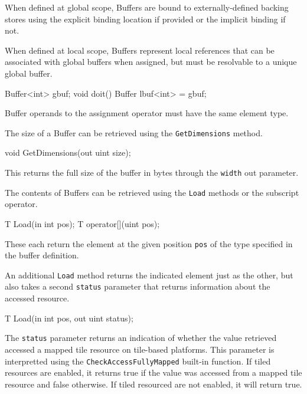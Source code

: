 When defined at global scope, Buffers are bound to externally-defined backing stores
using the explicit binding location if provided or the implicit binding if not.

When defined at local scope, Buffers represent local references
that can be associated with global buffers when assigned,
but must be resolvable to a unique global buffer.

\begin{HLSL}
  Buffer<int> gbuf;
  void doit() {
    Buffer lbuf<int> = gbuf;
  }
\end{HLSL}
Buffer operands to the assignment operator must have the same element type.


The size of a Buffer can be retrieved using the \texttt{GetDimensions} method.
\begin{HLSL}
void GetDimensions(out uint size);
\end{HLSL}

This returns the full size of the buffer in bytes through the \texttt{width} out parameter.


The contents of Buffers can be retrieved using the \texttt{Load} methods
or the subscript operator.

\begin{HLSL}
 T Load(in int pos);
 T operator[](uint pos);
\end{HLSL}

These each return the element at the given position \texttt{pos} of the type specified in the buffer definition.

An additional \texttt{Load} method returns the indicated element just as the other,
but also takes a second \texttt{status} parameter that returns information about the accessed resource.
\begin{HLSL}
 T Load(in int pos, out uint status);
\end{HLSL}

The \texttt{status} parameter returns an indication of whether the value retrieved accessed a mapped tile
resource on tile-based platforms. This parameter is interpretted using the \texttt{CheckAccessFullyMapped}
built-in function. If tiled resources are enabled, it returns true if the value was accessed from a mapped
tile resource and false otherwise. If tiled resourced are not enabled, it will return true.


